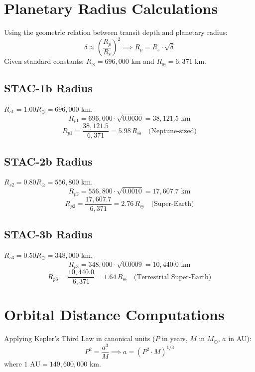 \documentclass[journal,10pt,twocolumn]{IEEEtran}
\begin{document}
\section{Planetary Radius Calculations}
Using the geometric relation between transit depth and planetary radius:
\begin{equation}
\delta \approx \left(\frac{R_p}{R_s}\right)^2 \implies R_p = R_s \cdot \sqrt{\delta}
\end{equation}
Given standard constants: $R_\odot = 696,000\text{ km}$ and $R_\oplus = 6,371\text{ km}$.

\subsection{STAC-1b Radius}
$R_{s1} = 1.00 R_\odot = 696,000\text{ km}$.
\begin{equation}
R_{p1} = 696,000 \cdot \sqrt{0.0030} = 38,121.5\text{ km}
\end{equation}
\begin{equation}
R_{p1} = \frac{38,121.5}{6,371} = 5.98\,R_\oplus \quad \text{(Neptune-sized)}
\end{equation}

\subsection{STAC-2b Radius}
$R_{s2} = 0.80 R_\odot = 556,800\text{ km}$.
\begin{equation}
R_{p2} = 556,800 \cdot \sqrt{0.0010} = 17,607.7\text{ km}
\end{equation}
\begin{equation}
R_{p2} = \frac{17,607.7}{6,371} = 2.76\,R_\oplus \quad \text{(Super-Earth)}
\end{equation}

\subsection{STAC-3b Radius}
$R_{s3} = 0.50 R_\odot = 348,000\text{ km}$.
\begin{equation}
R_{p3} = 348,000 \cdot \sqrt{0.0009} = 10,440.0\text{ km}
\end{equation}
\begin{equation}
R_{p3} = \frac{10,440.0}{6,371} = 1.64\,R_\oplus \quad \text{(Terrestrial Super-Earth)}
\end{equation}

\section{Orbital Distance Computations}
Applying Kepler's Third Law in canonical units ($P$ in years, $M$ in $M_\odot$, $a$ in AU):
\begin{equation}
P^2 = \frac{a^3}{M} \implies a = \left(P^2 \cdot M\right)^{1/3}
\end{equation}
where $1\text{ AU} = 149,600,000\text{ km}$.
\end{document}
